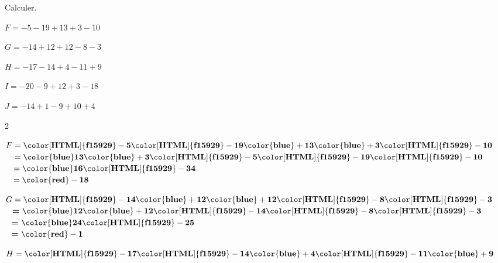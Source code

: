 \begin{exercice*}
    Calculer.
        \begin{list}{}
            \item $ F = -5-19+13+3-10 $
            \item $ G = -14+12+12-8-3 $
            \item $ H = -17-14+4-11+9 $
            \item $ I = -20-9+12+3-18 $
            \item $ J = -14+1-9+10+4 $
        \end{list}
\end{exercice*}
\begin{corrige}
    \phantom{rrr}    
    \begin{multicols}2
        \begin{list}{}            
            \item $ F = \mathbf{{\color[HTML]{f15929}-5}}\mathbf{{\color[HTML]{f15929}-19}}\mathbf{{\color{blue}+13}}\mathbf{{\color{blue}+3}}\mathbf{{\color[HTML]{f15929}-10}}$\\
            $ \phantom{A } = \mathbf{{\color{blue}13}}\mathbf{{\color{blue}+3}}\mathbf{{\color[HTML]{f15929}-5}}\mathbf{{\color[HTML]{f15929}-19}}\mathbf{{\color[HTML]{f15929}-10}}$\\
            $ \phantom{A } = \mathbf{{\color{blue}16}}\mathbf{{\color[HTML]{f15929}-34}}$\\
            $ \phantom{A } = \mathbf{{\color{red}-18}} $
            \item $ G = \mathbf{{\color[HTML]{f15929}-14}}\mathbf{{\color{blue}+12}}\mathbf{{\color{blue}+12}}\mathbf{{\color[HTML]{f15929}-8}}\mathbf{{\color[HTML]{f15929}-3}}$\\
            $ \phantom{A }\textbf{=}~\mathbf{{\color{blue}12}}\mathbf{{\color{blue}+12}}\mathbf{{\color[HTML]{f15929}-14}}\mathbf{{\color[HTML]{f15929}-8}}\mathbf{{\color[HTML]{f15929}-3}}$\\
            $ \phantom{A }\textbf{=}~\mathbf{{\color{blue}24}}\mathbf{{\color[HTML]{f15929}-25}}$\\
            $ \phantom{A }\textbf{=}~\mathbf{{\color{red}-1}} $
            \columnbreak
            \item $ H = \mathbf{{\color[HTML]{f15929}-17}}\mathbf{{\color[HTML]{f15929}-14}}\mathbf{{\color{blue}+4}}\mathbf{{\color[HTML]{f15929}-11}}\mathbf{{\color{blue}+9}}$\\

\end{list}
\end{multicols}
\end{corrige}
